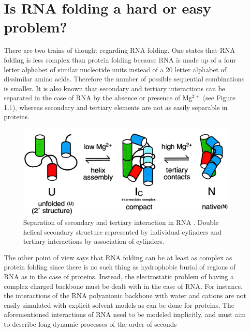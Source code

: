 \section{Is RNA folding a hard or easy problem?}
There are two trains of thought regarding RNA folding. One states
that RNA folding is less complex than protein folding
\cite{tinoco1999} because RNA is made up of a four letter alphabet
of similar nucleotide units instead of a 20 letter alphabet of
dissimilar amino acids. Therefore the number of possible sequential
combinations is smaller. It is also known that secondary and
tertiary interactions can be separated in the case of RNA by the
absence or presence of Mg$^{2+}$ \cite{rangan2003} (see Figure 1.1),
whereas secondary and tertiary elements are not as easily separable in proteins.
\begin{figure}[ht]
\centering
\includegraphics[scale=0.3]{Chapter1/rangan2003pnas.png}
\caption{Separation of secondary and tertiary interaction in
RNA \cite{rangan2003}. Double helical secondary structure
represented  by individual cylinders and tertiary interactions by
association of cylinders.}
\end{figure}
The other point of view says that RNA folding can be at least as
complex as protein folding \cite{moore1999a, sorin2004} since there
is no such thing as hydrophobic burial of regions of RNA as in the
case of proteins. Instead, the electrostatic problem of having a
complex charged backbone must be dealt with in the case of RNA.
For instance, the interactions of the RNA polyanionic backbone with
water and cations \cite{klein2004a} are not easily simulated with
explicit solvent models as can be done for proteins. The
aforementioned interactions of RNA need to be modeled implicitly, and
must aim to describe long dynamic processes of the order of seconds
